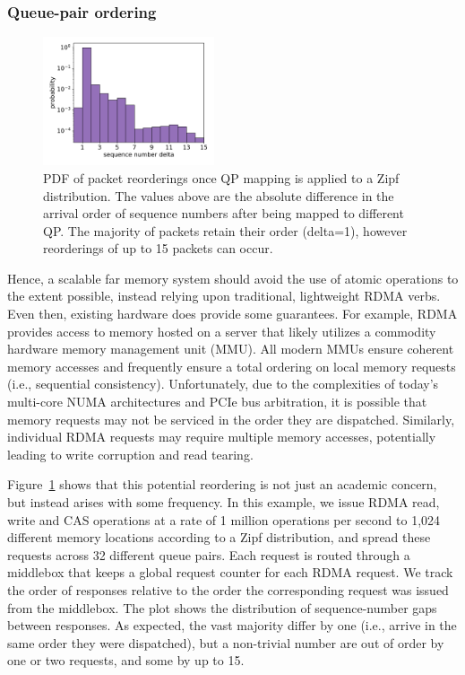 \subsubsection{Queue-pair ordering}

\begin{figure}[t]
    \includegraphics[width=0.45\textwidth]{fig/qp_reordering.pdf}
    
    \caption{PDF of packet reorderings once QP mapping is applied to a Zipf
    distribution. The values above are the absolute difference in the arrival
    order of sequence numbers after being mapped to different QP. The majority
    of packets retain their order (delta=1), however reorderings of up to 15
    packets can occur.}

    \label{fig:reorder}
\end{figure}

Hence, a scalable far memory system should avoid the use of atomic
operations to the extent possible, instead relying upon traditional,
lightweight RDMA verbs.  Even then, existing hardware does provide
some guarantees.  For example, RDMA provides access to memory hosted
on a server that likely utilizes a commodity hardware memory
management unit (MMU).  All modern MMUs ensure coherent memory
accesses and frequently ensure a total ordering on local memory
requests (i.e., sequential consistency).  Unfortunately, due to the
complexities of today's multi-core NUMA architectures and PCIe bus
arbitration, it is possible that memory requests may not be serviced
in the order they are dispatched.  Similarly, individual RDMA requests
may require multiple memory accesses, potentially leading to
write corruption and read tearing.

Figure~\ref{fig:reorder} shows that this potential reordering is not
just an academic concern, but instead arises with some frequency. In
this example, we issue RDMA read, write and CAS operations at a rate
of 1 million operations per second to 1,024 different memory locations
according to a Zipf distribution, and spread these requests across 32
different queue pairs. Each request is routed through a middlebox that
keeps a global request counter for each RDMA request.  We track the
order of responses relative to the order the corresponding request was
issued from the middlebox.  The plot shows the distribution of
sequence-number gaps between responses.  As expected, the vast
majority differ by one (i.e., arrive in the same order they were
dispatched), but a non-trivial number are out of order by one or two
requests, and some by up to 15.

